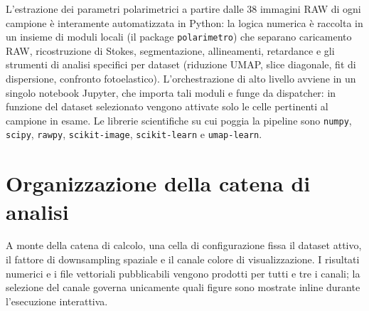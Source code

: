 
L'estrazione dei parametri polarimetrici a partire dalle 38 immagini RAW di ogni campione è interamente automatizzata in Python: la logica numerica è raccolta in un insieme di moduli locali (il package \texttt{polarimetro}) che separano caricamento RAW, ricostruzione di Stokes, segmentazione, allineamenti, retardance e gli strumenti di analisi specifici per dataset (riduzione UMAP, slice diagonale, fit di dispersione, confronto fotoelastico). L'orchestrazione di alto livello avviene in un singolo notebook Jupyter, che importa tali moduli e funge da dispatcher: in funzione del dataset selezionato vengono attivate solo le celle pertinenti al campione in esame. Le librerie scientifiche su cui poggia la pipeline sono \texttt{numpy}, \texttt{scipy}, \texttt{rawpy}, \texttt{scikit-image}, \texttt{scikit-learn} e \texttt{umap-learn}.

\section{Organizzazione della catena di analisi}
\label{sec:organizzazione_pipeline}
A monte della catena di calcolo, una cella di configurazione fissa il dataset attivo, il fattore di downsampling spaziale e il canale colore di visualizzazione. I risultati numerici e i file vettoriali pubblicabili vengono prodotti per tutti e tre i canali; la selezione del canale governa unicamente quali figure sono mostrate inline durante l'esecuzione interattiva.

